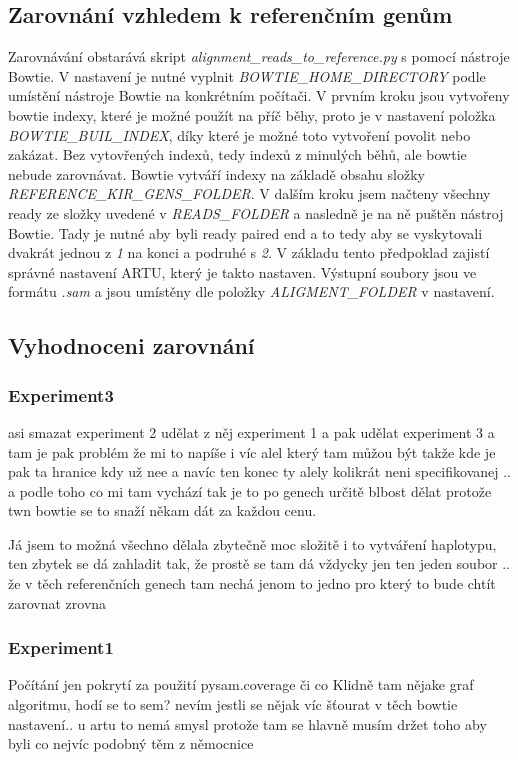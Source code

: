 \documentclass[czech,DP]{thesiskiv}
\numberwithin{equation}{section}
\begin{document}
\subsection{Zarovnání vzhledem k referenčním genům}
Zarovnávání obstarává skript \textit{alignment\_reads\_to\_reference.py} s pomocí nástroje Bowtie. V nastavení je nutné vyplnit \textit{BOWTIE\_HOME\_DIRECTORY} podle umístění nástroje Bowtie na konkrétním počítači. V prvním kroku jsou vytvořeny bowtie indexy, které je možné použít na příč běhy, proto je v nastavení položka \textit{BOWTIE\_BUIL\_INDEX}, díky které je možné toto vytvoření povolit nebo zakázat. Bez vytovřených indexů, tedy indexů z minulých běhů, ale bowtie nebude zarovnávat. Bowtie vytváří indexy na základě obsahu složky \textit{REFERENCE\_KIR\_GENS\_FOLDER}. V dalším kroku jsem načteny všechny ready ze složky uvedené v \textit{READS\_FOLDER} a nasledně je na ně puštěn nástroj Bowtie. Tady je nutné aby byli ready paired end a to tedy aby se vyskytovali dvakrát jednou z \textit{1} na konci a podruhé s \textit{2}. V základu tento předpoklad zajistí správné nastavení ARTU, který je takto nastaven. Výstupní soubory jsou ve formátu \textit{.sam} a jsou umístěny dle položky \textit{ALIGMENT\_FOLDER} v nastavení. 

\subsection{Vyhodnoceni zarovnání}
\subsubsection{Experiment3}
asi smazat experiment 2 udělat z něj experiment 1 a pak udělat experiment 3
a tam je pak problém že mi to napíše i víc alel který tam můžou být takže kde je pak ta hranice kdy už nee
a navíc ten konec ty alely kolikrát neni specifikovanej ..
a podle toho co mi tam vychází tak je to po genech určitě blbost dělat protože twn bowtie se to snaží někam dát za každou cenu.

Já jsem to možná všechno dělala zbytečně moc složitě i to vytváření haplotypu, ten zbytek se dá zahladit tak, že prostě se tam dá vždycky jen ten jeden soubor .. že v těch referenčních genech tam nechá jenom to jedno pro který to bude chtít zarovnat zrovna 

\subsubsection{Experiment1}
	Počítání jen pokrytí za použití pysam.coverage či co 
	Klidně tam nějake graf algoritmu, hodí se to sem? 
	nevím jestli se nějak víc šťourat v těch bowtie nastavení.. u artu to nemá smysl protože tam se hlavně musím držet toho aby byli co nejvíc podobný těm z němocnice
	
\end{document}
